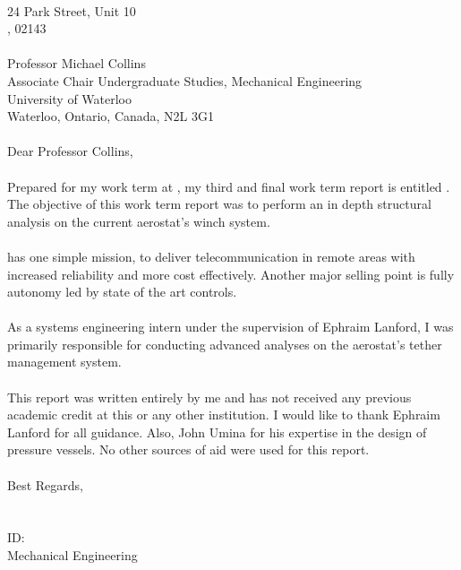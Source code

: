 \begin{declaration}
    \noindent
	\Company\\
	24 Park Street, Unit 10\\
	\CompanyCity , 02143\\
	\\ 
    \noindent
    Professor Michael Collins\\
	Associate Chair Undergraduate Studies, Mechanical Engineering\\
	University of Waterloo\\
	Waterloo, Ontario, Canada, N2L 3G1\\	\\
    \noindent
    Dear Professor Collins,\\ \\
	\noindent
    Prepared for my \Term work term at \textbf{\textsl{\Company}}, my third and final work term report is
	entitled \textbf{\textsl{\ReportTitle}}. The objective of this work term report was to perform an in depth structural analysis on the current aerostat's winch system.\\ \\
	\noindent	
	\Company  has one simple mission, to deliver telecommunication in remote areas with increased reliability and more cost effectively. Another major selling point is fully autonomy led by state of the art controls.\\\\
	\noindent
	As a systems engineering intern under the supervision of Ephraim Lanford, I was primarily responsible for conducting advanced analyses on the aerostat's tether management system.\\ \\
	\noindent
	This report was written entirely by me and has not received any previous academic credit at this or
	any other institution. I would like to thank Ephraim Lanford for all guidance. Also, John Umina for his expertise in the design of pressure vessels. No other sources of aid were used for this report.\\ \\
	\noindent
	Best Regards,\\
	\\
	\noindent
	\Seb\\
	ID: \\
	\Term Mechanical Engineering\\
	
	\thispagestyle{empty}
	
\end{declaration}


